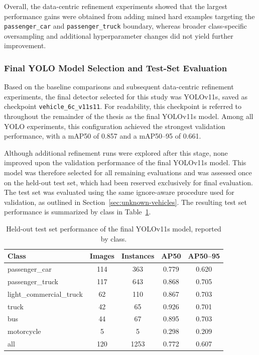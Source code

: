 \endgroup

Overall, the data-centric refinement experiments showed that the largest performance 
gains were obtained from adding mined hard examples targeting the 
\verb|passenger_car| and \verb|passenger_truck| boundary, whereas broader
class-specific oversampling and additional hyperparameter changes did not yield 
further improvement.


\subsubsection{Final YOLO Model Selection and Test-Set Evaluation}

Based on the baseline comparisons and subsequent data-centric refinement experiments, 
the final detector selected for this study was YOLOv11s, saved as checkpoint 
\verb|vehicle_6c_v11s11|. For readability, this checkpoint is referred to 
throughout the remainder of the thesis as the final YOLOv11s model. Among all 
YOLO experiments, this configuration achieved the strongest validation performance,
with a mAP50 of 0.857 and a mAP50--95 of 0.661.

Although additional refinement runs were explored after this stage, none improved 
upon the validation performance of the final YOLOv11s model. This model was therefore 
selected for all remaining evaluations and was assessed once on the held-out test
set, which had been reserved exclusively for final evaluation. The test set was 
evaluated using the same ignore-aware procedure used for validation, as outlined 
in Section~\ref{sec:unknown-vehicles}. The resulting test set performance is 
summarized by class in Table~\ref{tab:yolo-final-test-results}.

\begin{table}[!htbp]
    \centering
    \caption{Held-out test set performance of the final YOLOv11s model, reported by class.}
    \label{tab:yolo-final-test-results}
    \begin{tabular}{l c c c c}
        \toprule
        Class & Images & Instances & AP50 & AP50--95 \\
        \midrule
        passenger\_car            & 114 & 363  & 0.779 & 0.620 \\
        passenger\_truck          & 117 & 643  & 0.868 & 0.705 \\
        light\_commercial\_truck  & 62  & 110  & 0.867 & 0.703 \\
        truck                     & 42  & 65   & 0.926 & 0.701 \\
        bus                       & 44  & 67   & 0.895 & 0.703 \\
        motorcycle                & 5   & 5    & 0.298 & 0.209 \\
        \midrule
        all                       & 120 & 1253 & 0.772 & 0.607 \\
        \bottomrule
    \end{tabular}
\end{table}
\FloatBarrier

